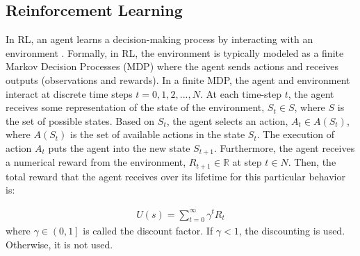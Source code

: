 
\subsection{Reinforcement Learning}
\label{subsec:background-rl}
In RL, an agent learns a decision-making process by interacting with an environment \cite{sutton_1998:rl}. Formally, in RL, the environment is typically modeled as a finite Markov Decision Processes (MDP) \cite{kolobov2012:markov} where the agent sends actions and receives outputs (observations and rewards). In a finite MDP, the agent and environment interact at discrete time steps $t = 0, 1, 2,..., N$. At each time-step $t$, the agent receives some representation of the state of the environment, ${S}_t \in S $, where $S$ is the set of possible states. Based on ${S}_t $, the agent selects an action, ${A}_t \in A(S_t) $, where $ A(S_t) $ is the set of available actions in the state ${S}_t $. The execution of action $A_{t}$ puts the agent into the new state $S_{t+1}$. Furthermore, the agent receives a numerical reward from the environment, $R_{t+1} \in  \mathbb{R}$ at step $t \in N$. Then, the total reward that the agent receives over its lifetime for this particular behavior is:

{\setlength{\mathindent}{6cm}
\begin{equation}
    \begin{split}
        U\left ( s \right ) = \sum_{t=0}^{\infty} \gamma^{t}R_{t}
    \end{split}
    \label{equ:total-reward}
\end{equation}
}
where $\gamma \in \left ( 0,1 \right ]$ is called the discount factor. If $\gamma < 1$, the discounting is used. Otherwise, it is not used. \\

